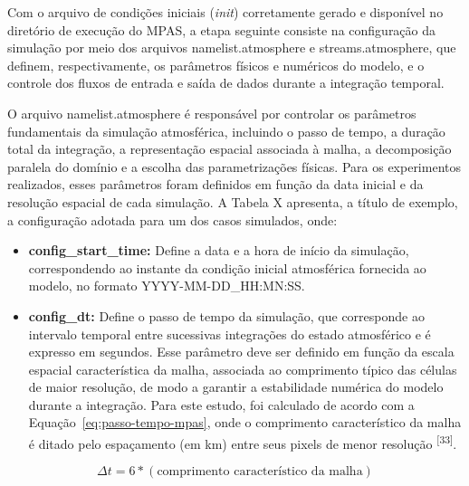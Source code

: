 \documentclass[12pt,a4paper,oneside]{book}
\begin{document}
Com o arquivo de condições iniciais (\emph{init}) corretamente gerado e disponível no diretório de execução do MPAS, a etapa seguinte consiste na configuração da simulação por meio dos arquivos namelist.atmosphere e streams.atmosphere, que definem, respectivamente, os parâmetros físicos e numéricos do modelo, e o controle dos fluxos de entrada e saída de dados durante a integração temporal.

O arquivo namelist.atmosphere é responsável por controlar os parâmetros fundamentais da simulação atmosférica, incluindo o passo de tempo, a duração total da integração, a representação espacial associada à malha, a decomposição paralela do domínio e a escolha das parametrizações físicas. Para os experimentos realizados, esses parâmetros foram definidos em função da data inicial e da resolução espacial de cada simulação. A Tabela X apresenta, a título de exemplo, a configuração adotada para um dos casos simulados, onde:

\begin{itemize}
\item
  \textbf{config\_start\_time:} Define a data e a hora de início da simulação, correspondendo ao instante da condição inicial atmosférica fornecida ao modelo, no formato YYYY-MM-DD\_HH:MN:SS.
\item
  \textbf{config\_dt:} Define o passo de tempo da simulação, que corresponde ao intervalo temporal entre sucessivas integrações do estado atmosférico e é expresso em segundos. Esse parâmetro deve ser definido em função da escala espacial característica da malha, associada ao comprimento típico das células de maior resolução, de modo a garantir a estabilidade numérica do modelo durante a integração. Para este estudo, foi calculado de acordo com a Equação~\ref{eq:passo-tempo-mpas}, onde o comprimento característico da malha é ditado pelo espaçamento (em km) entre seus pixels de menor resolução \textsuperscript{{[}33{]}}.
\end{itemize}

\begin{equation}
\label{eq:passo-tempo-mpas}
\Delta t = 6 \ast \left(\text{comprimento característico da malha}\right)
\end{equation}
\end{document}
